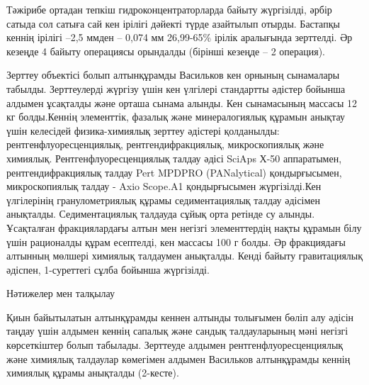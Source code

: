 \begin{multicols}{2}
Тәжірибе ортадан тепкіш гидроконцентраторларда байыту жүргізілді, әрбір
сатыда сол сатыға сай кен ірілігі дәйекті түрде азайтылып отырды.
Бастапқы кеннің ірілігі --2,5 ммден -- 0,074 мм 26,99-65\% ірілік
аралығында зерттелді. Әр кезеңде 4 байыту операциясы орындалды (бірінші
кезеңде -- 2 операция).

Зерттеу объектісі болып алтынқұрамды Васильков кен орнының сынамалары
табылды. Зерттеулерді жүргізу үшін кен үлгілері стандартты әдістер
бойынша алдымен ұсақталды және орташа сынама алынды. Кен сынамасының
массасы 12 кг болды.Кеннің элементтік, фазалық және минералогиялық
құрамын анықтау үшін келесідей физика-химиялық зерттеу әдістері
қолданылды: рентгенфлуоресценциялық, рентгендифракциялық, микроскопиялық
және химиялық. Рентгенфлуоресценциялық талдау әдісі SciAps Х-50
аппаратымен, рентгендифракциялық талдау Pert MPDPRO (PANalytical)
қондырғысымен, микроскопиялық талдау - Axio Scope.A1 қондырғысымен
жүргізілді.Кен үлгілерінің гранулометриялық құрамы седиментациялық
талдау әдісімен анықталды. Седиментациялық талдауда сұйық орта ретінде
су алынды. Ұсақталған фракциялардағы алтын мен негізгі элементтердің
нақты құрамын білу үшін рационалды құрам есептелді, кен массасы 100 г
болды. Әр фракциядағы алтынның мөлшері химиялық талдаумен анықталды.
Кенді байыту гравитациялық әдіспен, 1-суреттегі сұлба бойынша
жүргізілді.

Нәтижелер мен талқылау

Қиын байытылатын алтынқұрамды кеннен алтынды толығымен бөліп алу әдісін
таңдау үшін алдымен кеннің сапалық және сандық талдауларының мәні
негізгі көрсеткіштер болып табылады. Зерттеуде алдымен
рентгенфлуоресценциялық және химиялық талдаулар көмегімен алдымен
Васильков алтынқұрамды кеннің химиялық құрамы анықталды (2-кесте).
\end{multicols}


